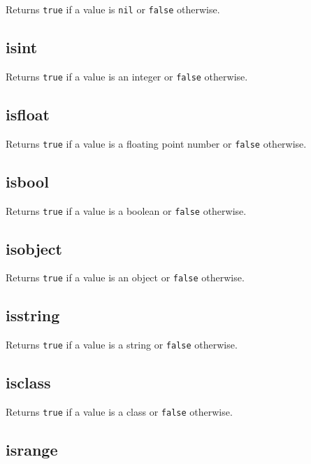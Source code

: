 Returns \texttt{true} if a value is \texttt{nil} or \texttt{false}
otherwise.

\hypertarget{isint}{%
\subsection{isint}\label{isint}}

Returns \texttt{true} if a value is an integer or \texttt{false}
otherwise.

\hypertarget{isfloat}{%
\subsection{isfloat}\label{isfloat}}

Returns \texttt{true} if a value is a floating point number or
\texttt{false} otherwise.

\hypertarget{isbool}{%
\subsection{isbool}\label{isbool}}

Returns \texttt{true} if a value is a boolean or \texttt{false}
otherwise.

\hypertarget{isobject}{%
\subsection{isobject}\label{isobject}}

Returns \texttt{true} if a value is an object or \texttt{false}
otherwise.

\hypertarget{isstring}{%
\subsection{isstring}\label{isstring}}

Returns \texttt{true} if a value is a string or \texttt{false}
otherwise.

\hypertarget{isclass}{%
\subsection{isclass}\label{isclass}}

Returns \texttt{true} if a value is a class or \texttt{false} otherwise.

\hypertarget{isrange}{%
\subsection{isrange}\label{isrange}}

